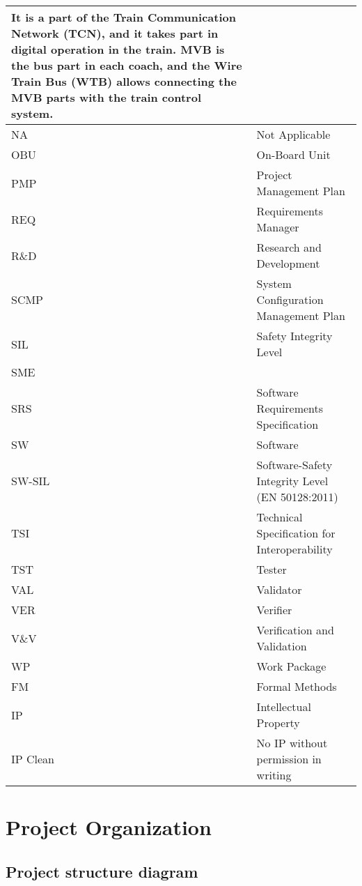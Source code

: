 \documentclass{template/openetcs_article}
\begin{document}
\begin{supertabular}{|m{3cm}m{11cm}|}
It is a part of the Train Communication Network (TCN), and it takes part in digital operation in the train. MVB is the bus part in each coach, and the Wire Train Bus (WTB) allows connecting the MVB parts with the train control system.\\\hline
NA &
Not Applicable\\\hline
OBU &
On-Board Unit\\\hline
PMP &
Project Management Plan\\\hline
REQ &
Requirements Manager\\\hline
R\&D &
Research and Development\\\hline
SCMP &
System Configuration Management Plan\\\hline
SIL &
Safety Integrity Level\\\hline
SME &
~
\\\hline
SRS &
Software Requirements Specification\\\hline
SW &
Software\\\hline
SW-SIL &
Software-Safety Integrity Level (EN 50128:2011)\\\hline
TSI &
Technical Specification for Interoperability\\\hline
TST &
Tester\\\hline
VAL &
Validator\\\hline
VER &
Verifier\\\hline
V\&V &
Verification and Validation\\\hline
WP &
Work Package\\\hline
FM &
Formal Methods\\\hline
IP &
Intellectual Property\\\hline
IP Clean &
No IP without permission in writing \\\hline
\end{supertabular}

\section{Project Organization}


\subsection{Project structure diagram}

\end{document}
